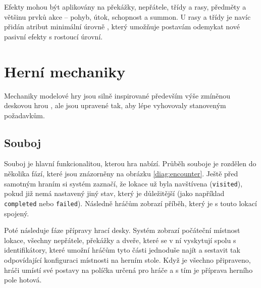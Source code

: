 Efekty mohou být aplikovány na překážky, nepřátele, třídy a rasy, předměty a většinu prvků akce -- pohyb, útok, schopnost a summon. U rasy a třídy je navíc přidán atribut minimální úrovně , který umožňuje postavám odemykat nové pasivní efekty s rostoucí úrovní.


\section{Herní mechaniky}
\label{sec:design_mechanics}

Mechaniky modelové hry jsou silně inspirované především výše zmíněnou deskovou hrou , ale jsou upravené tak, aby lépe vyhovovaly stanoveným požadavkům.


\subsection{Souboj}
\label{subsec:design_encounter}

Souboj je hlavní funkcionalitou, kterou hra nabízí. Průběh souboje je rozdělen do několika fází, které jsou znázorněny na obrázku \ref{diag:encounter}. Ještě před samotným hraním si systém zaznačí, že lokace už byla navštívena (\texttt{visited}), pokud již nemá nastavený jiný stav, který je důležitější (jako například \texttt{completed} nebo \texttt{failed}). Následně hráčům zobrazí příběh, který je s touto lokací spojený.

Poté následuje fáze přípravy hrací desky. Systém zobrazí počáteční místnost lokace, všechny nepřátele, překážky a dveře, které se v ní vyskytují spolu s identifikátory, které umožní hráčům tyto části jednoduše najít a sestavit tak odpovídající konfiguraci místnosti na herním stole. Když je všechno připraveno, hráči umístí své postavy na políčka určená pro hráče a s tím je příprava herního pole hotová.

